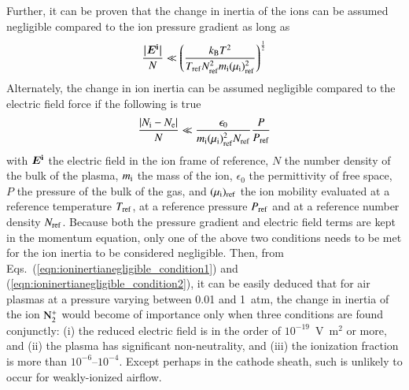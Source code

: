 \documentclass{warpdoc}
\renewcommand{\vec}[1]{\bm{#1}}
\begin{document}
Further, it can be proven that the change in inertia of the ions can be assumed negligible compared to the ion pressure gradient as long as
%
\begin{equation}
 \frac{\vec{|\vec{E^{\rm i}}|}}{N} \ll  \left(\frac{k_{\rm B} T^2}{T_{\rm ref} N_{\rm ref}^2 m_{\rm i}     (\mu_{\rm i})^2_{\rm ref}}\right)^\frac{1}{2}
\label{eqn:ioninertianegligible_condition1}
\end{equation}
%
Alternately, the change in ion inertia can be assumed negligible compared to the electric field force if the following is true
%
\begin{equation}
 \frac{ |N_{\rm i}-N_{\rm e}|}{N} \ll \frac{\epsilon_0}{m_{\rm i} (\mu_{\rm i})^2_{\rm ref}N_{\rm ref}}
\frac{P}{P_{\rm ref}}
\label{eqn:ioninertianegligible_condition2}
\end{equation}
%
with $\vec{E^{\rm i}}$ the electric field in the ion frame of reference, $N$ the number density of the bulk of the plasma, $m_{\rm i}$ the mass of the ion, $\epsilon_0$ the permittivity of free space, $P$ the pressure of the bulk of the gas, and $(\mu_{\rm i})_{\rm ref}$ the ion mobility evaluated at a reference temperature $T_{\rm ref}$, at a reference pressure $P_{\rm ref}$ and at a reference number density $N_{\rm ref}$. Because both the pressure gradient and electric field terms are kept in the momentum equation, only one of the above two conditions needs to be met for the ion inertia to be considered negligible. Then, from Eqs.\ (\ref{eqn:ioninertianegligible_condition1}) and (\ref{eqn:ioninertianegligible_condition2}), it can be easily deduced that for air plasmas at a pressure varying between 0.01 and 1~atm, the change in inertia of the ion $\rm N_2^+$ would become of importance only when three conditions are found conjunctly: (i) the reduced electric field is in the order of $10^{-19}$~V~m$^2$ or more, and (ii) the plasma has significant non-neutrality, and (iii) the ionization fraction is more than  $10^{-6}$--$10^{-4}$. Except perhaps in the cathode sheath, such is unlikely to occur for weakly-ionized airflow.   
\end{document}
